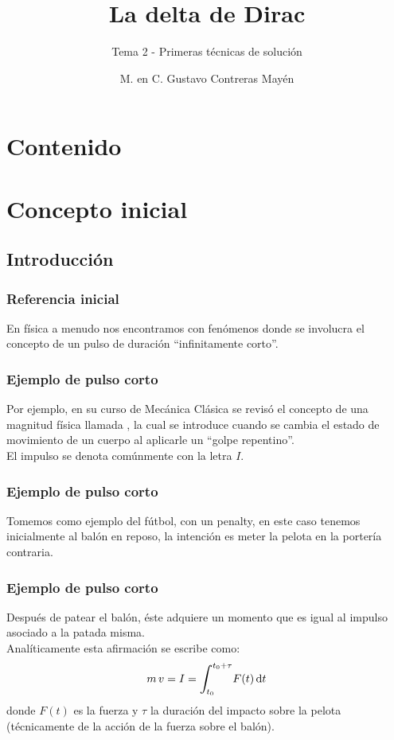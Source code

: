 \documentclass[12pt]{beamer}
\date{}
\title{\large{La delta de Dirac}}
\subtitle{Tema 2 - Primeras técnicas de solución}
\author{M. en C. Gustavo Contreras Mayén}
\begin{document}
\maketitle
\fontsize{14}{14}\selectfont
{}

\section*{Contenido}

\section{Concepto inicial}
\subsection{Introducción}

\begin{frame}
\frametitle{Referencia inicial}
En física a menudo nos encontramos con fenómenos donde se involucra el concepto de un pulso de duración \enquote{infinitamente corto}.
\end{frame}

\begin{frame}
\frametitle{Ejemplo de pulso corto}
Por ejemplo, en su curso de Mecánica Clásica se revisó el concepto de una magnitud física llamada , \pause la cual se introduce cuando se cambia el estado de movimiento de un cuerpo al aplicarle un \enquote{golpe repentino}.
\\
\bigskip
\pause
El impulso se denota comúnmente con la letra $I$.
\end{frame}

\begin{frame}
\frametitle{Ejemplo de pulso corto}
Tomemos como ejemplo del fútbol, con un penalty, \pause en este caso tenemos inicialmente al balón en reposo, \pause la intención es meter la pelota en la portería contraria.
\end{frame}

\begin{frame}
\frametitle{Ejemplo de pulso corto}
Después de patear el balón, éste adquiere un momento que es igual al impulso asociado a la patada misma.
\\
\bigskip
\pause
Analíticamente esta afirmación se escribe como:
\pause
\begin{align*}
m \, v = I = \scaleint{6ex}_{\bs t_{0}}^{t_{0} + \tau} F (t) \dd{t}
\end{align*}
donde $F (t)$ es la fuerza y $\tau$ la duración del impacto sobre la pelota (técnicamente de la acción de la fuerza sobre el balón).
\end{frame}
\end{document}
